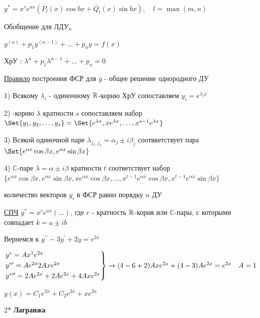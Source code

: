 \documentclass[12pt]{article}
\begin{document}
    $y^* = x^r e^{ax} (\overline{P}_l (x)\cos bx + \overline{Q}_l (x) \sin bx), \quad l = \max(m, n)$

    \vspace{5mm}
    Обобщение для ЛДУ$_n$

    $y^{(n)} + p_1 y^{(n - 1)} + \dots + p_n y = f(x)$

    ХрУ \Cat: $\lambda^n + p_1 \lambda^{n - 1} + \dots + p_n = 0$

    \vspace{5mm}
    \underline{Правило} построения ФСР для $\overline{y}$ - общее решение однородного ДУ

    1) Всякому $\lambda_i$ - одиночному $\mathbb{R}$-корню ХрУ сопоставляем $y_i = e^{\lambda_i x}$

    2) \Real-корню $\lambda$ кратности $s$ сопоставляем набор $\Set{y_1, y_2, \dots, y_s} = \Set{e^{\lambda x}, xe^{\lambda x}, \dots, x^{s - 1} e^{\lambda x}}$

    3) Всякой одиночной паре $\lambda_{j_1,j_2} = \alpha_j \pm i\beta_j$ соотвветствует пара $\Set{e^{\alpha x} \cos\beta x, e^{\alpha x} \sin\beta x}$

    4) $\mathbb{C}$-паре $\lambda = \alpha \pm i\beta$ кратности $t$ соответствует набор $\{e^{\alpha x} \cos \beta x, e^{\alpha x} \sin \beta x, x e^{\alpha x} \cos \beta x, \dots, x^{t - 1}e^{\alpha x} \cos\beta x, x^{t - 1}e^{\alpha x} \sin\beta x\}$

    \Nota количество векторов $y_i$ в ФСР равно порядку $n$ ДУ

    \underline{СПЧ} $y^* = x^r e^{ax} (\dots)$, где $r$ - кратность $\mathbb{R}$-корня или $\mathbb{C}$-пары, с которыми совпадает $k = a \pm ib$

    \Ex Вернемся к $y^{\prime\prime} - 3y^\prime + 2y = e^{2x}$

    $\begin{rcases*}
    y^* = Ax^1 e^{2x} \\

    y^{*\prime} = Ae^{2x} 2Axe^{2x} \\

    y^{*\prime\prime} = 2Ae^{2x} + 2Ae^{2x} + 4Axe^{2x}
    \end{rcases*} \to (4 - 6 + 2) Axe^{2x} + (4 - 3) Ae^{2x} = e^{2x} \quad A = 1$

    $y(x) = C_1 e^{2x} + C_2 e^{2x} + xe^{2x}$

    \vspace{10mm}

    2* \textbf{Лагранжа}
\end{document}
